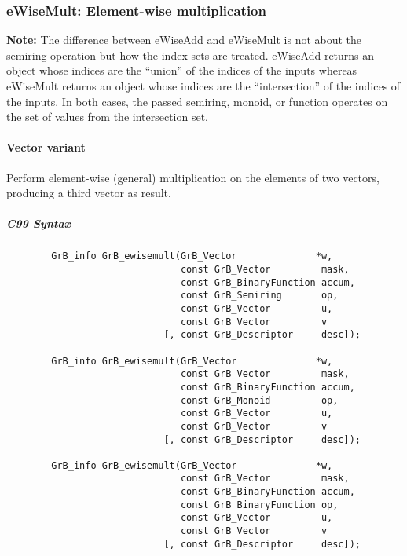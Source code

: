 \subsubsection{{\sf eWiseMult}: Element-wise multiplication}

{\bf Note:} The difference between {\sf eWiseAdd} and {\sf eWiseMult} is not 
about the semiring operation but how the index sets are treated.
{\sf eWiseAdd} returns an object whose indices are the ``union'' of the 
indices of the inputs whereas {\sf eWiseMult} returns an object whose indices 
are the ``intersection'' of the indices of the inputs. In both cases, the 
passed semiring, monoid, or function operates on the set of values from the 
intersection set. 


\paragraph{Vector variant}

Perform element-wise (general) multiplication on the elements of two vectors,
producing a third vector as result.

\subparagraph{C99 Syntax}

\begin{verbatim}
        GrB_info GrB_ewisemult(GrB_Vector              *w,
                               const GrB_Vector         mask,
                               const GrB_BinaryFunction accum,
                               const GrB_Semiring       op, 
                               const GrB_Vector         u,
                               const GrB_Vector         v
                            [, const GrB_Descriptor     desc]);
                            
        GrB_info GrB_ewisemult(GrB_Vector              *w,
                               const GrB_Vector         mask,
                               const GrB_BinaryFunction accum,
                               const GrB_Monoid         op, 
                               const GrB_Vector         u,
                               const GrB_Vector         v
                            [, const GrB_Descriptor     desc]);
                            
        GrB_info GrB_ewisemult(GrB_Vector              *w,
                               const GrB_Vector         mask,
                               const GrB_BinaryFunction accum,
                               const GrB_BinaryFunction op, 
                               const GrB_Vector         u,
                               const GrB_Vector         v
                            [, const GrB_Descriptor     desc]);
\end{verbatim}

